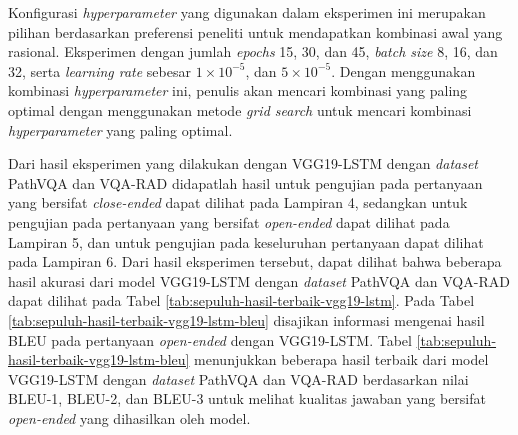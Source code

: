 \par Konfigurasi \textit{hyperparameter} yang digunakan dalam eksperimen ini merupakan pilihan berdasarkan preferensi peneliti untuk mendapatkan kombinasi awal yang rasional. Eksperimen dengan jumlah \textit{epochs} 15, 30, dan 45, \textit{batch size} 8, 16, dan 32, serta \textit{learning rate} sebesar $1 \times 10^{-5}$, dan $5 \times 10^{-5}$. Dengan menggunakan kombinasi \textit{hyperparameter} ini, penulis akan mencari kombinasi yang paling optimal dengan menggunakan metode \textit{grid search} untuk mencari kombinasi \textit{hyperparameter} yang paling optimal.


\par Dari hasil eksperimen yang dilakukan dengan VGG19-LSTM dengan \textit{dataset} PathVQA dan VQA-RAD didapatlah hasil untuk pengujian pada pertanyaan yang bersifat \textit{close-ended} dapat dilihat pada Lampiran 4, sedangkan untuk pengujian pada pertanyaan yang bersifat \textit{open-ended} dapat dilihat pada Lampiran 5, dan untuk pengujian pada keseluruhan pertanyaan dapat dilihat pada Lampiran 6. Dari hasil eksperimen tersebut, dapat dilihat bahwa beberapa hasil akurasi dari model VGG19-LSTM dengan \textit{dataset} PathVQA dan VQA-RAD dapat dilihat pada Tabel \ref{tab:sepuluh-hasil-terbaik-vgg19-lstm}. Pada Tabel \ref{tab:sepuluh-hasil-terbaik-vgg19-lstm-bleu} disajikan informasi mengenai hasil BLEU pada pertanyaan \textit{open-ended} dengan VGG19-LSTM. Tabel \ref{tab:sepuluh-hasil-terbaik-vgg19-lstm-bleu} menunjukkan beberapa hasil terbaik dari model VGG19-LSTM dengan \textit{dataset} PathVQA dan VQA-RAD berdasarkan nilai BLEU-1, BLEU-2, dan BLEU-3 untuk melihat kualitas jawaban yang bersifat \textit{open-ended} yang dihasilkan oleh model.

